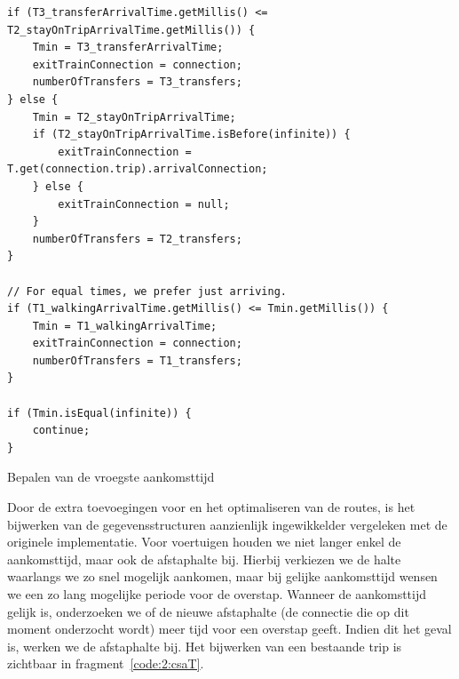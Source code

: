 \begin{listing}[htb]
\begin{verbatim}
if (T3_transferArrivalTime.getMillis() <= T2_stayOnTripArrivalTime.getMillis()) {
	Tmin = T3_transferArrivalTime;
	exitTrainConnection = connection;
	numberOfTransfers = T3_transfers;
} else {
	Tmin = T2_stayOnTripArrivalTime;
	if (T2_stayOnTripArrivalTime.isBefore(infinite)) {
		exitTrainConnection = T.get(connection.trip).arrivalConnection;
	} else {
		exitTrainConnection = null;
	}
	numberOfTransfers = T2_transfers;
}

// For equal times, we prefer just arriving.
if (T1_walkingArrivalTime.getMillis() <= Tmin.getMillis()) {
	Tmin = T1_walkingArrivalTime;
	exitTrainConnection = connection;
	numberOfTransfers = T1_transfers;
}

if (Tmin.isEqual(infinite)) {
	continue;
}
		\end{verbatim}
		\caption[CSA: Bepalen van vroegste aankomsttijd]{Bepalen van de vroegste aankomsttijd}
		\label{code:2:csaMin}
\end{listing}

Door de extra toevoegingen voor  en het optimaliseren van de routes, is het bijwerken van de gegevensstructuren aanzienlijk ingewikkelder vergeleken met de originele implementatie. Voor voertuigen houden we niet langer enkel de aankomsttijd, maar ook de afstaphalte bij. Hierbij verkiezen we de halte waarlangs we zo snel mogelijk aankomen, maar bij gelijke aankomsttijd wensen we een zo lang mogelijke periode voor de overstap. Wanneer de aankomsttijd gelijk is, onderzoeken we of de nieuwe afstaphalte (de connectie die op dit moment onderzocht wordt) meer tijd voor een overstap geeft. Indien dit het geval is, werken we de afstaphalte bij. Het bijwerken van een bestaande trip is zichtbaar in fragment~\ref{code:2:csaT}.

